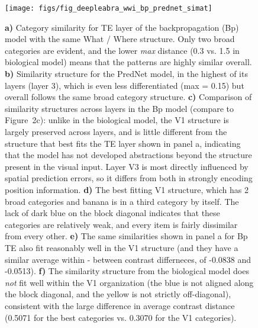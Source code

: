 \documentclass[12pt,twoside]{naturefigs}  %
\newif\myifpdf
\begin{document}
\begin{figure}
  \centering\texttt{[image: figs/fig\_deepleabra\_wwi\_bp\_prednet\_simat]}
  \caption{\small \protect{} {\bf a)} Category similarity for TE layer of the backpropagation (Bp) model with the same What / Where structure.  Only two broad categories are evident, and the lower {\em max} distance (0.3 vs. 1.5 in biological model) means that the patterns are highly similar overall.  {\bf b)} Similarity structure for the PredNet model, in the highest of its layers (layer 3), which is even less differentiated (max = 0.15) but overall follows the same broad category structure.  {\bf c)} Comparison of similarity structures across layers in the Bp model (compare to Figure~2c): unlike in the biological model, the V1 structure is largely preserved across layers, and is little different from the structure that best fits the TE layer shown in panel a, indicating that the model has not developed abstractions beyond the structure present in the visual input.  Layer V3 is most directly influenced by spatial prediction errors, so it differs from both in strongly encoding position information.  {\bf d)} The best fitting V1 structure, which has 2 broad categories and banana is in a third category by itself.  The lack of dark blue on the block diagonal indicates that these categories are relatively weak, and every item is fairly dissimilar from every other.  {\bf e)} The same similarities shown in panel a for Bp TE also fit reasonably well in the V1 structure (and they have a similar average within - between contrast differneces, of -0.0838 and -0.0513).  {\bf f)} The similarity structure from the biological model does {\em not} fit well within the V1 organization (the blue is not aligned along the block diagonal, and the yellow is not strictly off-diagonal), consistent with the large difference in average contrast distance (0.5071 for the best categories vs. 0.3070 for the V1 categories).}
  \label{fig.bpred}
\end{figure}

\end{document}
